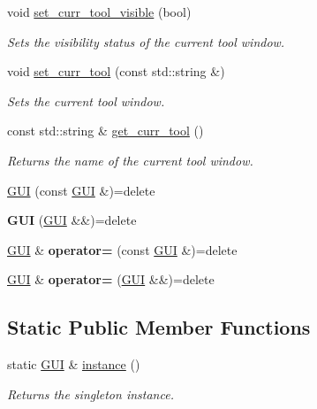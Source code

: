 \begin{DoxyCompactItemize}
void \hyperlink{class_g_u_i_ae841ba53ef5f7152fa900c682edc9788}{set\+\_\+curr\+\_\+tool\+\_\+visible} (bool)
\begin{DoxyCompactList}\small\item\em Sets the visibility status of the current tool window. \end{DoxyCompactList}\item 
void \hyperlink{class_g_u_i_ad27594472b3c4625d5cf1ca24b31d1a4}{set\+\_\+curr\+\_\+tool} (const std\+::string \&)
\begin{DoxyCompactList}\small\item\em Sets the current tool window. \end{DoxyCompactList}\item 
const std\+::string \& \hyperlink{class_g_u_i_a1640c56f8c04cea1df046220781f9d22}{get\+\_\+curr\+\_\+tool} ()
\begin{DoxyCompactList}\small\item\em Returns the name of the current tool window. \end{DoxyCompactList}\item 
\hyperlink{class_g_u_i_a0b8d80c1dc4e62859e0f0b80d6175205}{G\+UI} (const \hyperlink{class_g_u_i}{G\+UI} \&)=delete
\item 
{\bfseries G\+UI} (\hyperlink{class_g_u_i}{G\+UI} \&\&)=delete\hypertarget{class_g_u_i_a9bbaf9f1720fecb1f260f10473fe1323}{}\label{class_g_u_i_a9bbaf9f1720fecb1f260f10473fe1323}

\item 
\hyperlink{class_g_u_i}{G\+UI} \& {\bfseries operator=} (const \hyperlink{class_g_u_i}{G\+UI} \&)=delete\hypertarget{class_g_u_i_ae3f7d63739574619a294f606696f50db}{}\label{class_g_u_i_ae3f7d63739574619a294f606696f50db}

\item 
\hyperlink{class_g_u_i}{G\+UI} \& {\bfseries operator=} (\hyperlink{class_g_u_i}{G\+UI} \&\&)=delete\hypertarget{class_g_u_i_a3553773dac200692ecabcfdeb3ae2f51}{}\label{class_g_u_i_a3553773dac200692ecabcfdeb3ae2f51}

\end{DoxyCompactItemize}
\subsection*{Static Public Member Functions}
\begin{DoxyCompactItemize}
\item 
static \hyperlink{class_g_u_i}{G\+UI} \& \hyperlink{class_g_u_i_a169694dda858ea12986f00ee32ac7add}{instance} ()
\begin{DoxyCompactList}\small\item\em Returns the singleton instance. \end{DoxyCompactList}\end{DoxyCompactItemize}
